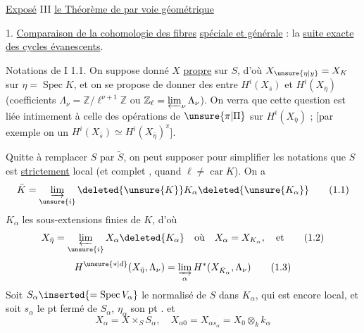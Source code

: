 \uline{Exposé} III \uline{le Théorème de  par voie géométrique}

1. \uline{Comparaison de la cohomologie des  fibres}   \uline{spéciale et générale} : la \uline{suite exacte des cycles évanescents}.


Notations de I 1.1. On suppose donné $X$ \uline{propre} sur $S$, d'où $X_{\unsure{\eta|y}}=X_K$ sur $\eta=\operatorname{Spec}K$, et on se propose de  donner des  entre $H^i(X_{\bar s})$ et $H^i(X_{\bar\eta})$ (coefficients $\Lambda_\nu=\mathbb Z/\ell^{\nu+1}\mathbb Z$ ou $\mathbb Z_\ell=\varprojlim_\nu\Lambda_\nu$). On verra que cette question est liée intimement à celle des opérations de $\unsure{\pi|\Pi}$ sur $H^i(X_{\bar\eta})$ ; [par exemple on  un  $H^i(X_{\bar s})\simeq H^i(X_{\bar\eta})^\pi$].

Quitte à remplacer $S$ par $\widetilde S$, on peut supposer pour simplifier les notations que $S$ est \uline{strictement}  local (et  complet  \unsure{\dots}, quand $\ell\ne\operatorname{car}K$). On a
\[
\bar K=\varinjlim_{\unsure{i}}\deleted{\unsure{K}}K_\alpha\deleted{\unsure{K_\alpha}}
\tag*{(1.1)}
\]
$K_\alpha$ les sous-extensions finies de $K$, d'où
\[
X_{\bar\eta}=\varprojlim_{\unsure{i}}X_\alpha\deleted{K_\alpha}\quad\text{où}\quad X_\alpha=X_{K_\alpha},\quad\text{et}
\tag*{(1.2)}
\]
\[
H^{\unsure{*|d}}(X_{\bar\eta},\Lambda_\nu)=\varinjlim_\alpha H^*(X_{\bar K_\alpha},\Lambda_\nu)
\tag*{(1.3)}
\]
Soit $S_\alpha\inserted{=\operatorname{Spec}V_\alpha}$ le normalisé de $S$ dans $K_\alpha$, qui est encore  local,  et soit $s_\alpha$ le pt fermé de $S_\alpha$, $\eta_\alpha$ son pt .  et
\[
X_\alpha=X\times_S S_\alpha,\quad X_{\alpha0}=X_{\alpha s_\alpha}=X_0\otimes_k k_\alpha
\tag*{(1.4)}
\]
